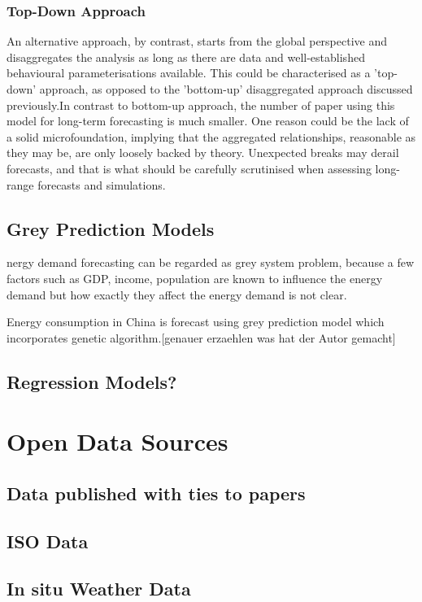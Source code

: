 \documentclass[lettersize,journal]{IEEEtran}
\begin{document}
    \subsubsection{Top-Down Approach}
  An alternative approach, by contrast, starts from the global perspective and disaggregates the analysis as long as there are data and well-established behavioural parameterisations available. This could be characterised as a 'top-down' approach, as opposed to the 'bottom-up' disaggregated approach discussed previously.In contrast to bottom-up approach, the number of paper using this model for long-term forecasting is much smaller. One reason could be the lack of a solid microfoundation, implying that the aggregated relationships, reasonable as they may be, are only loosely backed by theory. Unexpected breaks may derail forecasts, and that is what should be carefully scrutinised when assessing long-range forecasts and simulations.

  
  \subsection{Grey Prediction Models}
  nergy demand forecasting can be regarded as grey system problem, because a few factors such as GDP, income, population are known to influence the energy demand but how exactly they affect the energy demand is not clear.

  Energy consumption in China is forecast using grey prediction model which incorporates genetic algorithm\cite{272}.[genauer erzaehlen was hat der Autor gemacht]

  \subsection{Regression Models?}








\section{Open Data Sources}
  \subsection{Data published with ties to papers}
  \subsection{ISO Data}
  \subsection{In situ Weather Data}
\end{document}
